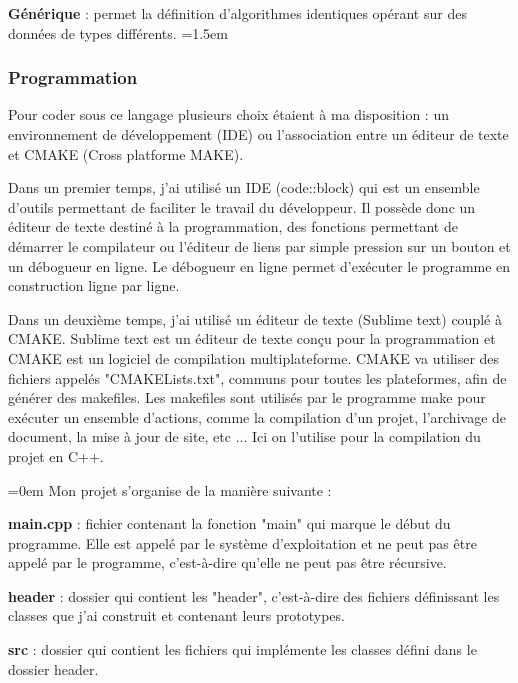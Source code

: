 \documentclass[a4paper,12pt]{article}
\begin{document}
\vspace{0.25cm}
\textbf{Générique} : permet la définition d'algorithmes identiques opérant sur des données de types différents.
\parindent=1.5em
\vspace{0.25cm}

 		\subsubsection{Programmation}

  Pour coder sous ce langage plusieurs choix étaient à ma disposition : un environnement de développement (IDE) ou l'association entre un éditeur de texte et CMAKE (Cross platforme MAKE). 
  
  Dans un premier temps, j'ai utilisé un IDE (code::block) qui est un ensemble d'outils permettant de faciliter le travail du développeur. Il possède donc un éditeur de texte destiné à la programmation, des fonctions permettant de démarrer le compilateur ou l'éditeur de liens par simple pression sur un bouton et un débogueur en ligne. Le débogueur en ligne permet d'exécuter le programme en construction ligne par ligne. 
  
  Dans un deuxième temps, j'ai utilisé un éditeur de texte (Sublime text) couplé à CMAKE. Sublime text est un éditeur de texte conçu pour la programmation et CMAKE est un logiciel de compilation multiplateforme. CMAKE va utiliser des fichiers appelés "CMAKELists.txt", communs pour toutes les plateformes, afin de générer des makefiles. Les makefiles sont utilisés par le programme make pour exécuter un ensemble d'actions, comme la compilation d'un projet, l'archivage de document, la mise à jour de site, etc ... Ici on l'utilise pour la compilation du projet en C++.
 
\vspace{0.25cm}
\parindent=0em
  Mon projet s'organise de la manière suivante : 
  
\textbf{main.cpp} :  fichier contenant la fonction "main" qui marque le début du programme. Elle est appelé par le système d'exploitation et ne peut pas être appelé par le programme, c'est-à-dire qu'elle ne peut pas être récursive.
 
\textbf{header} : dossier qui contient les "header", c'est-à-dire des fichiers définissant les classes que j'ai construit et contenant leurs prototypes.
 
\textbf{src} : dossier qui contient les fichiers qui implémente les classes défini dans le dossier header. 
\end{document}
